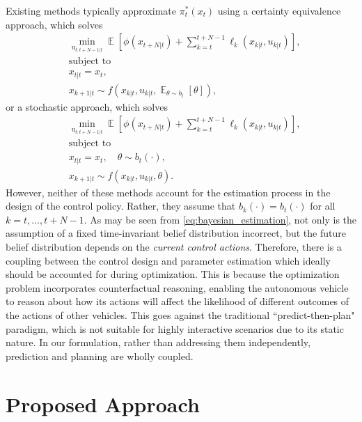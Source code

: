 \documentclass[letterpaper, 10 pt, conference]{IEEEconf}
\newcommand{\Expectation}{\mathop{{}\mathbb{E}}}
\begin{document}
Existing methods typically approximate $\pi^{\ast}_{t}(x_{t})$ using a certainty equivalence approach, which solves 
\begin{subequations} \label{prob:ce}
    \begin{align}
        & \min_{\mathrm{u}_{t:t+N-1|t}} \Expectation \left[\phi(x_{t+N|t}) + \sum_{k=t}^{t+N-1} \ell_{k}(x_{k|t}, u_{k|t}) \right], \\
        & \text{subject to} \nonumber\\
        & x_{t|t} = x_{t}, \\
        & x_{k+1|t} \sim f(x_{k|t}, u_{k|t}, \Expectation_{\theta \sim b_{t}}[\theta]),
    \end{align}
\end{subequations}
or a stochastic approach, which solves
\begin{subequations} \label{prob:stoch}
    \begin{align}
        & \min_{\mathrm{u}_{t:t+N-1|t}} \Expectation \left[\phi(x_{t+N|t}) + \sum_{k=t}^{t+N-1} \ell_{k}(x_{k|t}, u_{k|t}) \right], \\
        & \text{subject to} \nonumber\\
        & x_{t|t} = x_{t}, \quad \theta \sim b_{t}(\cdot), \label{const:stoch_dist} \\
        & x_{k+1|t} \sim f(x_{k|t}, u_{k|t}, \theta).
    \end{align}
\end{subequations}
% 
However, neither of these methods account for the estimation process in the design of the control policy. Rather, they assume that $b_{k}(\cdot) = b_{t}(\cdot)$ for all $k = t, \dots, t+N-1$. 
As may be seen from \eqref{eq:bayesian_estimation}, not only is the assumption of a fixed time-invariant belief distribution incorrect, but the future belief distribution depends on the \emph{current control actions}. 
Therefore, there is a coupling between the control design and parameter estimation which ideally should be accounted for during optimization.
% 
This is because the optimization problem incorporates counterfactual reasoning, enabling the autonomous vehicle to reason about how its actions will affect the likelihood of different outcomes of the actions of other vehicles.
This goes against the traditional ``predict-then-plan" paradigm, which is not suitable for highly interactive scenarios due to its static nature. 
In our formulation, rather than addressing them independently, prediction and planning are wholly coupled.

\section{Proposed Approach}
\end{document}
